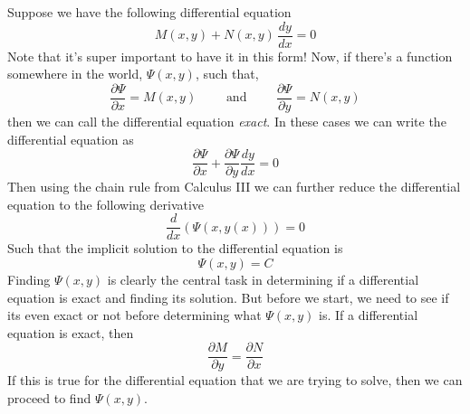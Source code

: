 \documentclass[10pt,reqno]{book}
\theoremstyle{definition}
\begin{document}
	Suppose we have the following differential equation
	\begin{equation}
		M(x,y) + N(x,y)\, \frac{dy}{dx} = 0
	\end{equation}
	Note that it's super important to have it in this form! Now, if there's a function somewhere in the world, $ \Psi(x,y) $, such that,
	\begin{equation}
		\frac{\partial \Psi}{\partial x} = M(x,y) \qquad \text{ and } \qquad \frac{\partial \Psi}{\partial y} = N(x,y)
	\end{equation}
	then we can call the differential equation \textit{exact}. In these cases we can write the differential equation as
	\begin{equation}
		\frac{\partial \Psi}{\partial x} + \frac{\partial \Psi}{\partial y} \frac{dy}{dx} = 0
	\end{equation}
	Then using the chain rule from Calculus III we can further reduce the differential equation to the following derivative
	\[ \frac{d}{dx}(\Psi(x,y(x))) = 0 \]
	Such that the implicit solution to the differential equation is
	\begin{equation}
		\Psi(x,y) = C
	\end{equation}
	Finding $ \Psi(x,y) $ is clearly the central task in determining if a differential equation is exact and finding its solution. But before we start, we need to see if its even exact or not before determining what $ \Psi(x,y) $ is. If a differential equation is exact, then
	\begin{equation}
		\frac{\partial M}{\partial y} = \frac{\partial N}{\partial x}
	\end{equation}
	If this is true for the differential equation that we are trying to solve, then we can proceed to find $ \Psi(x,y) $.
\end{document}

